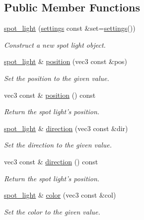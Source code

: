 \subsection*{Public Member Functions}
\begin{DoxyCompactItemize}
\item 
\hyperlink{classgfx_1_1spot__light_a4411e140963386020c3f9f40fbc7a150}{spot\-\_\-light} (\hyperlink{classgfx_1_1spot__light_1_1settings}{settings} const \&set=\hyperlink{classgfx_1_1spot__light_1_1settings}{settings}())
\begin{DoxyCompactList}\small\item\em Construct a new spot light object. \end{DoxyCompactList}\item 
\hyperlink{classgfx_1_1spot__light}{spot\-\_\-light} \& \hyperlink{classgfx_1_1spot__light_a6acbb3333e51737d93d9706ed6754f09}{position} (vec3 const \&pos)
\begin{DoxyCompactList}\small\item\em Set the position to the given value. \end{DoxyCompactList}\item 
vec3 const \& \hyperlink{classgfx_1_1spot__light_a12692afb00d28f11ec64d9e4251facec}{position} () const 
\begin{DoxyCompactList}\small\item\em Return the spot light's position. \end{DoxyCompactList}\item 
\hyperlink{classgfx_1_1spot__light}{spot\-\_\-light} \& \hyperlink{classgfx_1_1spot__light_af848e9db5433c53574a391ed3a8ee250}{direction} (vec3 const \&dir)
\begin{DoxyCompactList}\small\item\em Set the direction to the given value. \end{DoxyCompactList}\item 
vec3 const \& \hyperlink{classgfx_1_1spot__light_a91568d1939a485bff85025be19179451}{direction} () const 
\begin{DoxyCompactList}\small\item\em Return the spot light's position. \end{DoxyCompactList}\item 
\hyperlink{classgfx_1_1spot__light}{spot\-\_\-light} \& \hyperlink{classgfx_1_1spot__light_a55459ae2ecff48146d399048424f9439}{color} (vec3 const \&col)
\begin{DoxyCompactList}\small\item\em Set the color to the given value. \end{DoxyCompactList}\item 

\end{DoxyCompactItemize}
